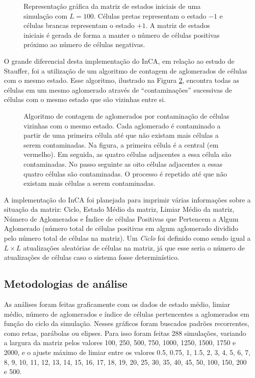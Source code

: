 \documentclass[
	12pt,				%
	openright,			%
	twoside,			%
	a4paper,			%
	english,			%
	french,				%
	spanish,			%
	brazil				%
	]{abntex2}
\begin{document}
\begin{figure}
    \centering
    \caption{Representação gráfica da matriz de estados iniciais de uma simulação com $L=100$. Células pretas representam o estado $-1$ e células brancas representam o estado $+1$. A matriz de estados iniciais é gerada de forma a manter o número de células positivas próximo ao número de células negativas.}
    \label{fig:matrizL100Ciclo0}
\end{figure}

O grande diferencial desta implementação do InCA, em relação ao estudo de Stauffer, foi a utilização de um algoritmo de contagem de aglomerados de células com o mesmo estado. Esse algoritmo, ilustrado na Figura \ref{fig:contamination}, encontra todas as células em um mesmo aglomerado através de ``contaminações'' sucessivas de células com o mesmo estado que são vizinhas entre si.

\begin{figure}
    \centering
    \caption{Algoritmo de contagem de aglomerados por contaminação de células vizinhas com o mesmo estado. Cada aglomerado é contaminado a partir de uma primeira célula até que não existam mais células a serem contaminadas. Na figura, a primeira célula é a central (em vermelho). Em seguida, as quatro células adjacentes a essa célula são contaminadas. No passo seguinte as oito células adjacentes a essas quatro células são contaminadas. O processo é repetido até que não existam mais células a serem contaminadas.}
    \label{fig:contamination}
\end{figure}

A implementação do InCA foi planejada para imprimir várias informações sobre a situação da matriz: Ciclo, Estado Médio da matriz, Limiar Médio da matriz, Número de Aglomerados e Índice de células Positivas que Pertencem a Algum Aglomerado (número total de células positivas em algum aglomerado dividido pelo número total de células na matriz). Um \textit{Ciclo} foi definido como sendo igual a $L\times L$ atualizações aleatórias de células na matriz, já que esse seria o número de atualizações de células caso o sistema fosse determinístico.

\subsection*{Metodologias de análise}

As análises foram feitas graficamente com os dados de estado médio, limiar médio, número de aglomerados e índice de células pertencentes a aglomerados em função do ciclo da simulação. Nesses gráficos foram buscados padrões recorrentes, como retas, parábolas ou elipses. Para isso foram feitas 288 simulações, variando a largura da matriz pelos valores 100, 250,
500,
750,
1000,
1250,
1500,
1750 e
2000, e o ajuste máximo de limiar entre os valores 0.5,
0.75,
1,
1.5,
2,
3,
4,
5,
6,
7,
8,
9,
10,
11,
12,
13,
14,
15,
16,
17,
18,
19,
20,
25,
30,
35,
40,
45,
50,
100,
150,
200 e
500.
\end{document}
